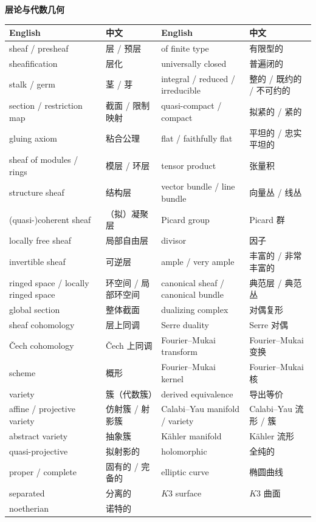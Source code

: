 \vspace{0.8em}
\noindent\textbf{层论与代数几何}\par\nobreak
\vspace{0.3em}
{\small
\begin{longtable}{p{}p{}p{}p{}}
\toprule
English & 中文 & English & 中文 \\
\midrule
\endhead
sheaf / presheaf & 层 / 预层 & of finite type & 有限型的\\
sheafification & 层化 & universally closed & 普遍闭的\\
stalk / germ & 茎 / 芽 & integral / reduced / irreducible & 整的 / 既约的 / 不可约的\\
section / restriction map & 截面 / 限制映射 & quasi-compact / compact & 拟紧的 / 紧的\\
gluing axiom & 粘合公理 & flat / faithfully flat & 平坦的 / 忠实平坦的\\
sheaf of modules / rings & 模层 / 环层 & tensor product & 张量积\\
structure sheaf & 结构层 & vector bundle / line bundle & 向量丛 / 线丛\\
(quasi-)coherent sheaf & （拟）凝聚层 & Picard group & Picard 群\\
locally free sheaf & 局部自由层 & divisor & 因子\\
invertible sheaf & 可逆层 & ample / very ample & 丰富的 / 非常丰富的\\
ringed space / locally ringed space & 环空间 / 局部环空间 & canonical sheaf / canonical bundle & 典范层 / 典范丛\\
global section & 整体截面 & dualizing complex & 对偶复形\\
sheaf cohomology & 层上同调 & Serre duality & Serre 对偶\\
Čech cohomology & Čech 上同调 & Fourier–Mukai transform & Fourier–Mukai 变换\\
scheme & 概形 & Fourier–Mukai kernel & Fourier–Mukai 核\\
variety & 簇（代数簇） & derived equivalence & 导出等价\\
affine / projective variety & 仿射簇 / 射影簇 & Calabi–Yau manifold / variety & Calabi–Yau 流形 / 簇\\
abstract variety & 抽象簇 & Kähler manifold & Kähler 流形\\
quasi-projective & 拟射影的 & holomorphic & 全纯的\\
proper / complete & 固有的 / 完备的 & elliptic curve & 椭圆曲线\\
separated & 分离的 & $K3$ surface & $K3$ 曲面\\
noetherian & 诺特的 & & \\
\bottomrule
\end{longtable}}

